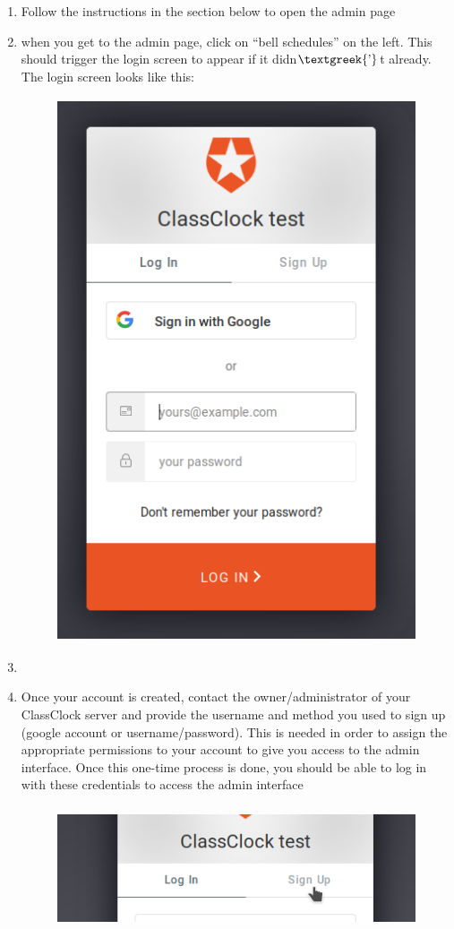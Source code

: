 \documentclass{article}
\begin{document}
\begin{enumerate}
\item {Follow the instructions in the section below to open the admin page}
\item {when you get to the admin page, click on “bell schedules” on the left. This should trigger the login screen to appear if
it didn$\text{\textgreek{’}}$t already. The login screen looks like this:\newline
}
\begin{figure}
\includegraphics[width=4.2181in,height=6.322in]{Mini20Manual-img005.png}\end{figure}
\item {}
\item {Once your account is created, contact the owner/administrator of your ClassClock server and provide the username and
method you used to sign up (google account or username/password). This is needed in order to assign the appropriate
permissions to your account to give you access to the admin interface. Once this one-time process is done, you should
be able to log in with these credentials to access the admin interface}
\begin{figure}
\includegraphics[width=4.7701in,height=1.4366in]{Mini20Manual-img006.png}\end{figure}
\end{enumerate}
\end{document}
